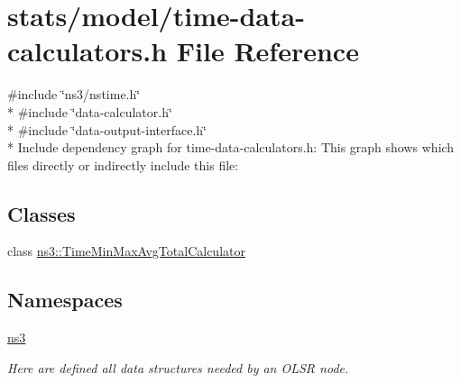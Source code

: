 \hypertarget{time-data-calculators_8h}{}\section{stats/model/time-\/data-\/calculators.h File Reference}
\label{time-data-calculators_8h}
{\ttfamily \#include \char`\"{}ns3/nstime.\+h\char`\"{}}\\*
{\ttfamily \#include \char`\"{}data-\/calculator.\+h\char`\"{}}\\*
{\ttfamily \#include \char`\"{}data-\/output-\/interface.\+h\char`\"{}}\\*
Include dependency graph for time-\/data-\/calculators.h\+:
This graph shows which files directly or indirectly include this file\+:
\subsection*{Classes}
\begin{DoxyCompactItemize}
\item 
class \hyperlink{classns3_1_1TimeMinMaxAvgTotalCalculator}{ns3\+::\+Time\+Min\+Max\+Avg\+Total\+Calculator}
\end{DoxyCompactItemize}
\subsection*{Namespaces}
\begin{DoxyCompactItemize}
\item 
 \hyperlink{namespacens3}{ns3}
\begin{DoxyCompactList}\small\item\em Here are defined all data structures needed by an O\+L\+SR node. \end{DoxyCompactList}\end{DoxyCompactItemize}
